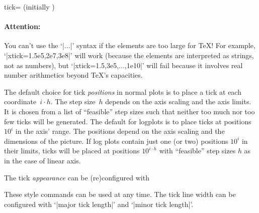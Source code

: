 \begin{pgfplotsxykey}{\x tick= (initially \marg{})}
\begin{codeexample}[]
\end{codeexample}

\paragraph{Attention:} You can't use the `|...|' syntax if the elements are too large for \TeX! For example, `|xtick=1.5e5,2e7,3e8|' will work (because the elements are interpreted as strings, not as numbers), but `|xtick=1.5,3e5,...,1e10|' will fail because it involves real number arithmetics beyond \TeX's capacities.
\vspace*{0.3cm}

\noindent
The default choice for tick \emph{positions} in normal plots is to place a tick at each coordinate~$i\cdot h$. The step size~$h$ depends on the axis scaling and the axis limits. It is chosen from a list of ``feasible'' step sizes such that neither too much nor too few ticks will be generated. The default for logplots is to place ticks at positions $10^i$ in the axis' range. The positions depend on the axis scaling and the dimensions of the picture. If log plots contain just one (or two) positions $10^i$ in their limits, ticks will be placed at positions $10^{i\cdot h}$ with ``feasible'' step sizes $h$ as in the case of linear axis.

\noindent
The tick \emph{appearance} can be (re)configured with
\begin{codeexample}
\end{codeexample}

These style commands can be used at any time. The tick line width can be configured with `|major tick length|' and `|minor tick length|'.

\begin{codeexample}[]
\end{codeexample}


\end{pgfplotsxykey}
